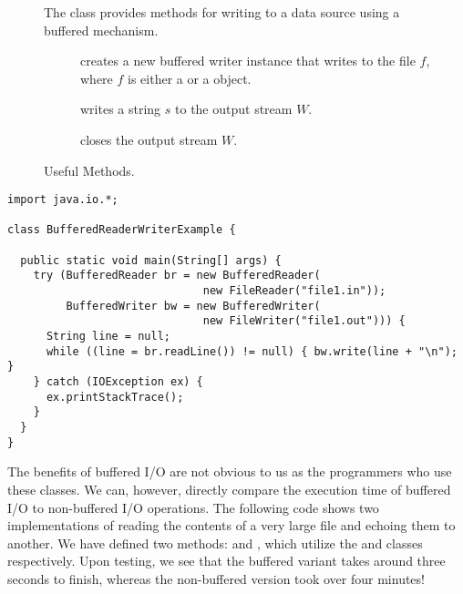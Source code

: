 \begin{figure}[tp]
  \small
  \begin{tcolorbox}[title=BufferedWriter Methods]
    The  class provides methods for writing to a data source using a buffered mechanism.
    \vspace{2ex}
  \begin{description}
    \item [] creates a new buffered writer instance that writes to the file $f$, where $f$ is either a  or a  object.
    \item [] writes a string $s$ to the output stream $W$.
    \item [] closes the output stream $W$.
  \end{description}
\end{tcolorbox}
  \caption{Useful  Methods.}
  \label{fig:bw}
\end{figure}


\begin{lstlisting}[language=MyJava]
import java.io.*;

class BufferedReaderWriterExample {

  public static void main(String[] args) {
    try (BufferedReader br = new BufferedReader(
                              new FileReader("file1.in"));
         BufferedWriter bw = new BufferedWriter(
                              new FileWriter("file1.out"))) {
      String line = null;
      while ((line = br.readLine()) != null) { bw.write(line + "\n"); }
    } catch (IOException ex) {
      ex.printStackTrace();
    }
  }
}
\end{lstlisting}

The benefits of buffered I/O are not obvious to us as the programmers who use these classes. 
We can, however, directly compare the execution time of buffered I/O to non-buffered I/O operations. 
The following code shows two implementations of reading the contents of a very large file and echoing them to another. 
We have defined two methods:  and , which utilize the  and  classes respectively. 
Upon testing, we see that the buffered variant takes around three seconds to finish, whereas the non-buffered version took over four minutes!

